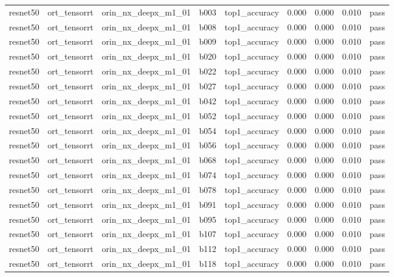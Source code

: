 \begin{table}[t]
\begin{tabular}{lrrrrrrrr}
resnet50 & ort\_tensorrt & orin\_nx\_deepx\_m1\_01 & b003 & top1\_accuracy & 0.000 & 0.000 & 0.010 & pass \\
resnet50 & ort\_tensorrt & orin\_nx\_deepx\_m1\_01 & b008 & top1\_accuracy & 0.000 & 0.000 & 0.010 & pass \\
resnet50 & ort\_tensorrt & orin\_nx\_deepx\_m1\_01 & b009 & top1\_accuracy & 0.000 & 0.000 & 0.010 & pass \\
resnet50 & ort\_tensorrt & orin\_nx\_deepx\_m1\_01 & b020 & top1\_accuracy & 0.000 & 0.000 & 0.010 & pass \\
resnet50 & ort\_tensorrt & orin\_nx\_deepx\_m1\_01 & b022 & top1\_accuracy & 0.000 & 0.000 & 0.010 & pass \\
resnet50 & ort\_tensorrt & orin\_nx\_deepx\_m1\_01 & b027 & top1\_accuracy & 0.000 & 0.000 & 0.010 & pass \\
resnet50 & ort\_tensorrt & orin\_nx\_deepx\_m1\_01 & b042 & top1\_accuracy & 0.000 & 0.000 & 0.010 & pass \\
resnet50 & ort\_tensorrt & orin\_nx\_deepx\_m1\_01 & b052 & top1\_accuracy & 0.000 & 0.000 & 0.010 & pass \\
resnet50 & ort\_tensorrt & orin\_nx\_deepx\_m1\_01 & b054 & top1\_accuracy & 0.000 & 0.000 & 0.010 & pass \\
resnet50 & ort\_tensorrt & orin\_nx\_deepx\_m1\_01 & b056 & top1\_accuracy & 0.000 & 0.000 & 0.010 & pass \\
resnet50 & ort\_tensorrt & orin\_nx\_deepx\_m1\_01 & b068 & top1\_accuracy & 0.000 & 0.000 & 0.010 & pass \\
resnet50 & ort\_tensorrt & orin\_nx\_deepx\_m1\_01 & b074 & top1\_accuracy & 0.000 & 0.000 & 0.010 & pass \\
resnet50 & ort\_tensorrt & orin\_nx\_deepx\_m1\_01 & b078 & top1\_accuracy & 0.000 & 0.000 & 0.010 & pass \\
resnet50 & ort\_tensorrt & orin\_nx\_deepx\_m1\_01 & b091 & top1\_accuracy & 0.000 & 0.000 & 0.010 & pass \\
resnet50 & ort\_tensorrt & orin\_nx\_deepx\_m1\_01 & b095 & top1\_accuracy & 0.000 & 0.000 & 0.010 & pass \\
resnet50 & ort\_tensorrt & orin\_nx\_deepx\_m1\_01 & b107 & top1\_accuracy & 0.000 & 0.000 & 0.010 & pass \\
resnet50 & ort\_tensorrt & orin\_nx\_deepx\_m1\_01 & b112 & top1\_accuracy & 0.000 & 0.000 & 0.010 & pass \\
resnet50 & ort\_tensorrt & orin\_nx\_deepx\_m1\_01 & b118 & top1\_accuracy & 0.000 & 0.000 & 0.010 & pass \\

\end{tabular}
\end{table}
